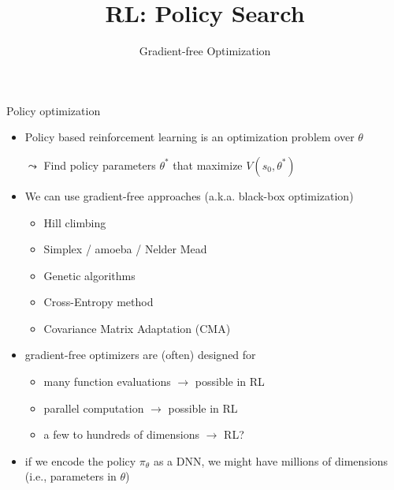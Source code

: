 \documentclass[aspectratio=169]{../latex_main/tntbeamer}  %
\title[RL: Gradient-free]{RL: Policy Search}
\subtitle{Gradient-free Optimization}
\begin{document}
	
	\maketitle

\begin{frame}[c]{Policy optimization}

\begin{itemize}
	\item Policy based reinforcement learning is an \alert{optimization} problem over $\theta$
	\item[$\leadsto$] Find policy parameters $\theta^*$ that maximize $V(s_0, \theta^*)$
	\item We can use gradient-free approaches (a.k.a. black-box optimization)
	\begin{itemize}
		\item Hill climbing
		\item Simplex / amoeba / Nelder Mead
		\item Genetic algorithms
		\item Cross-Entropy method
		\item Covariance Matrix Adaptation (CMA)
	\end{itemize}
	\pause
	\smallskip
	\item gradient-free optimizers are (often) designed for
	\begin{itemize}
		\item many function evaluations $\to$ possible in RL
		\item parallel computation $\to$ possible in RL
		\item a few to hundreds of dimensions $\to$ RL?
	\end{itemize}
	\pause
	\item if we encode the policy $\pi_\theta$ as a DNN, we might have \alert{millions} of dimensions (i.e., parameters in $\theta$)

\end{itemize}

\end{frame}
\end{document}
